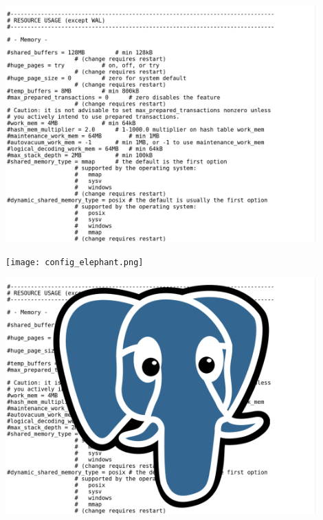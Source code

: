 \documentclass[usenames,dvipsnames, 18pt, compress, aspectratio=169]{beamer}
\begin{document}
\begin{frame}[fragile]{}
    \frametitle{}
    \begin{center}

		\begin{overprint}[12.5cm]
        \includegraphics[width=0.9\textwidth,center]{config.png}

        \texttt{[image: config\_elephant.png]}

        \includegraphics[width=0.9\textwidth,center]{config_elephant_eyes.png}

		\end{overprint}

    \end{center}
\end{frame}
\end{document}
